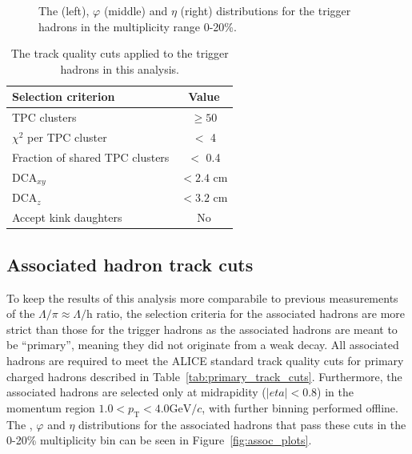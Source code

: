 \begin{figure}[t!]
\begin{minipage}{0.32\textwidth}
	\end{minipage}
	\caption{The \pt (left), $\varphi$ (middle) and $\eta$ (right) distributions for the trigger hadrons in the multiplicity range 0-20\%.}
	\label{fig:trigger_plots}
\end{figure}

\begin{table}[h]
	\centering
	\caption{The track quality cuts applied to the trigger hadrons in this analysis.}
	\label{tab:trigger_track_cuts}
	\begin{tabular}{ l  c }
		\hline
		Selection criterion & Value \\
		\hline
		TPC clusters & $\geq 50$ \\
		$\chi^{2}$ per TPC cluster  & $<$ 4 \\
		Fraction of shared TPC clusters & $<$ 0.4 \\
		DCA$_{xy}$ & $< 2.4$ cm \\
		DCA$_{z}$ & $< 3.2$ cm \\
		Accept kink daughters & No \\
		\hline
	\end{tabular}
\end{table}

\subsection{Associated hadron track cuts}

To keep the results of this analysis more comparabile to previous measurements of the $\Lambda/\pi \approx \Lambda/$h ratio, the selection criteria for the associated hadrons are more strict than those for the trigger hadrons as the associated hadrons are meant to be ``primary'', meaning they did not originate from a weak decay. All associated hadrons are required to meet the ALICE standard track quality cuts for primary charged hadrons described in Table~\ref{tab:primary_track_cuts}. Furthermore, the associated hadrons are selected only at midrapidity ($|eta| < 0.8$) in the momentum region ${1.0 < p_{\text{T}} < 4.0 \text{GeV}/c}$,
with further binning performed offline. The \pt, $\varphi$ and $\eta$ distributions for the associated hadrons that pass these cuts in the 0-20\% multiplicity bin can be seen in Figure~\ref{fig:assoc_plots}.

